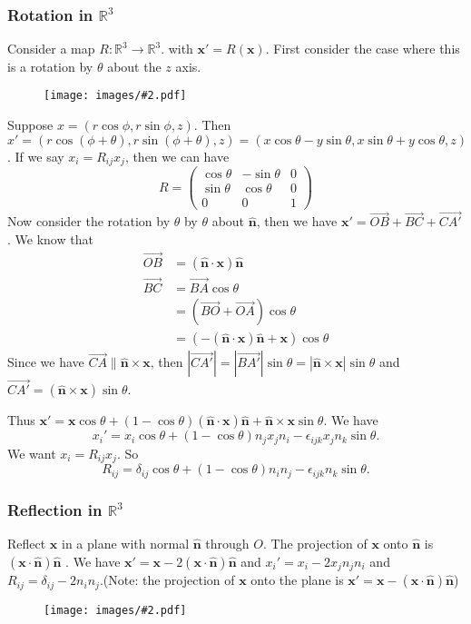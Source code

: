 \documentclass[a4paper]{article}
\theoremstyle{definition}
\newcommand{\mb}[1]{\mathbf{#1}}
\newcommand{\R}{\mathbb{R}}
\newcommand{\img}[2][]{\begin{figure}[ht]\centering\texttt{[image: images/\#2.pdf]}\end{figure}}
\begin{document}
\subsubsection{Rotation in \texorpdfstring{$\R^3$}{R3}}
Consider a map $R: \R^3 \rightarrow \R^3$. with $\mb{x}' = R(\mb{x})$. First consider the case where this is a rotation by $\theta$ about the $z$ axis.
\img{vm_3}
Suppose $x = (r\cos\phi, r\sin\phi, z)$. Then $x' = (r\cos(\phi + \theta), r\sin(\phi + \theta), z) = (x\cos\theta - y\sin\theta, x\sin\theta + y\cos\theta, z)$. If we say $x_i = R_{ij} x_j$, then we can have
\[
R = \begin{pmatrix}
  \cos\theta & -\sin\theta & 0 \\
  \sin\theta & \cos\theta & 0 \\
  0 & 0 & 1
\end{pmatrix}
\]
Now consider the rotation by $\theta$ by $\theta$ about $\mb{\hat{n}}$, then we have $\mb{x'} = \overrightarrow{OB} + \overrightarrow{BC} + \overrightarrow{CA'}$.
We know that
\begin{align*}
  \overrightarrow{OB} &= \mb{(\hat{n}\cdot x)\hat{n}}\\
  \overrightarrow{BC} &= \overrightarrow{BA}\cos\theta\\
  &= (\overrightarrow{BO} + \overrightarrow{OA})\cos\theta \\
  &= \mb{(-(\hat{n}\cdot x)\hat{n} + x)}\cos\theta
\end{align*}
Since we have $\overrightarrow{CA} \parallel \mb{\hat{n}\times x}$, then $|\overrightarrow{CA'}| = |\overrightarrow{BA'}|\sin\theta  = |\mb{\hat{n}\times x}|\sin\theta$ and $\overrightarrow{CA'} = \mb{(\hat{n}\times x)}\sin\theta$.

Thus $\mb{x' = x}\cos\theta + (1 - \cos\theta)\mb{(\hat{n}\cdot x)\hat{n} + \hat{n}\times x}\sin\theta$. We have
\[
x_i' = x_i\cos\theta + (1 - \cos\theta)n_jx_jn_i - \epsilon_{ijk}x_jn_k\sin\theta.
\]
We want $x_i = R_{ij}x_j$. So
\[
R_{ij} = \delta_{ij}\cos\theta + (1 - \cos\theta)n_in_j - \epsilon_{ijk}n_k\sin\theta.
\]

\subsubsection{Reflection in \texorpdfstring{$\R^3$}{R3}}
Reflect $\mb{x}$ in a plane with normal $\mb{\hat{n}}$ through $O$. The projection of $\mb{x}$ onto $\mb{\hat{n}}$ is $\mb{(x\cdot \hat{n})\hat{n}}$ . We have $\mb{x}' = \mb{x} - 2\mb{(x\cdot \hat{n})\hat{n}}$ and $x_i' = x_i - 2x_jn_jn_i$ and $R_{ij} = \delta_{ij} - 2n_in_j$.(Note: the projection  of $\mb{x}$ onto the plane is $\mb{x' = x - (x\cdot \hat{n})\hat{n}}$)
\img{vm_4}
\end{document}
